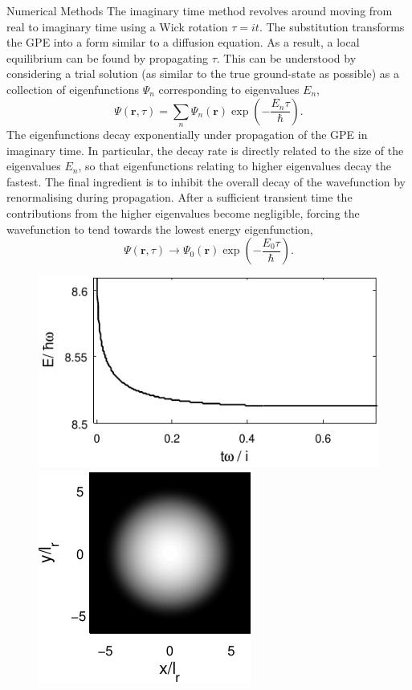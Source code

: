 \begin{chapter}{\label{cha:numerics}Numerical Methods}
	The imaginary time method revolves around moving from real to imaginary time using a Wick rotation $\tau = it$. The substitution transforms the GPE into a form similar to a diffusion equation. As a result, a local equilibrium can be found by propagating $\tau$. This can be understood by considering a trial solution (as similar to the true ground-state as possible) as a collection of eigenfunctions $\Psi_n$ corresponding to eigenvalues $E_n$,
\begin{equation*}
\Psi(\mathbf{r},\tau) = \sum_n \Psi_n(\mathbf{r})\exp\left(-\frac{E_n\tau}{\hbar}\right).
\end{equation*}
The eigenfunctions decay exponentially under propagation of the GPE in imaginary time. In particular, the decay rate is directly related to the size of the eigenvalues $E_n$, so that eigenfunctions relating to higher eigenvalues decay the fastest. The final ingredient is to inhibit the overall decay of the wavefunction by renormalising during propagation. After a sufficient transient time the contributions from the higher eigenvalues become negligible, forcing the wavefunction to tend towards the lowest energy eigenfunction,
\begin{equation*}
\Psi(\mathbf{r},\tau) \rightarrow \Psi_0(\mathbf{r})\exp\left(-\frac{E_0\tau}{\hbar}\right).
\end{equation*}
\begin{figure}
	\centering
	\includegraphics{numerics/figures/imag-time-prop-energy.pdf}
	\includegraphics{numerics/figures/imag-time-gs.pdf}

\end{figure}
\end{chapter}
